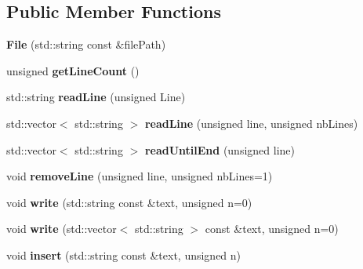 \subsection*{Public Member Functions}
\begin{DoxyCompactItemize}
\item 
\hypertarget{classstb_1_1File_aba531afd2b1f5d7509b4fed47fd5b8b5}{{\bfseries File} (std\+::string const \&file\+Path)}\label{classstb_1_1File_aba531afd2b1f5d7509b4fed47fd5b8b5}

\item 
\hypertarget{classstb_1_1File_a575134290b4770a3faf0a5e861ab2e77}{unsigned {\bfseries get\+Line\+Count} ()}\label{classstb_1_1File_a575134290b4770a3faf0a5e861ab2e77}

\item 
\hypertarget{classstb_1_1File_a4ba3975d99f41a794319c6c016e66364}{std\+::string {\bfseries read\+Line} (unsigned Line)}\label{classstb_1_1File_a4ba3975d99f41a794319c6c016e66364}

\item 
\hypertarget{classstb_1_1File_a411bad6d8eea50b7074649290f18ae7c}{std\+::vector$<$ std\+::string $>$ {\bfseries read\+Line} (unsigned line, unsigned nb\+Lines)}\label{classstb_1_1File_a411bad6d8eea50b7074649290f18ae7c}

\item 
\hypertarget{classstb_1_1File_a946117f555001d7beae15d0639f49824}{std\+::vector$<$ std\+::string $>$ {\bfseries read\+Until\+End} (unsigned line)}\label{classstb_1_1File_a946117f555001d7beae15d0639f49824}

\item 
\hypertarget{classstb_1_1File_a4bde5efa432fbbb1b967009ba8d40e09}{void {\bfseries remove\+Line} (unsigned line, unsigned nb\+Lines=1)}\label{classstb_1_1File_a4bde5efa432fbbb1b967009ba8d40e09}

\item 
\hypertarget{classstb_1_1File_a9c36d802b4631092ca66327aa6178da8}{void {\bfseries write} (std\+::string const \&text, unsigned n=0)}\label{classstb_1_1File_a9c36d802b4631092ca66327aa6178da8}

\item 
\hypertarget{classstb_1_1File_a297a596e18b9cb9cc6fb205795cfc7b7}{void {\bfseries write} (std\+::vector$<$ std\+::string $>$ const \&text, unsigned n=0)}\label{classstb_1_1File_a297a596e18b9cb9cc6fb205795cfc7b7}

\item 
\hypertarget{classstb_1_1File_a4039760270d2c349f0ebf9747655f112}{void {\bfseries insert} (std\+::string const \&text, unsigned n)}\label{classstb_1_1File_a4039760270d2c349f0ebf9747655f112}


\end{DoxyCompactItemize}

